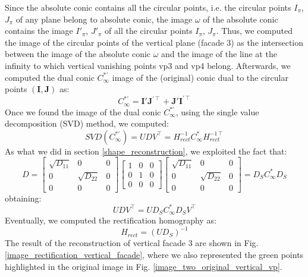 \documentclass[11pt, oneside]{article}
\begin{document}
Since the absolute conic contains all the circular points, i.e. the circular points $\textit{I}_\pi$, $\textit{J}_\pi$ of any plane belong to absolute conic, the image $\omega$ of the absolute conic contains the image $\textit{I}'_\pi$, $\textit{J}'_\pi$ of all the circular points $\textit{I}_\pi$, $\textit{J}_\pi$. Thus, we computed the image of the circular points of the vertical plane (facade 3) as the intersection between the image of the absolute conic $\omega$ and the image of the line at the infinity to which vertical vanishing points vp3 and vp4 belong. Afterwards, we computed the dual conic $C^{*'}_\infty$ image of the (original) conic dual to the circular points $(\textbf{I},\textbf{J})$ as:
\begin{equation}
	C^{*'}_\infty = \textbf{I}' \textbf{J}^{'\intercal} + \textbf{J}' \textbf{I}^{'\intercal}
\end{equation}
Once we found the image of the dual conic $C^{*'}_\infty$, using the single value decomposition (SVD) method, we computed:
\begin{equation}
	SVD(C^{*'}_\infty) = U D V^\intercal = H_{rect}^{-1} C^*_\infty H_{rect}^{-1\intercal}
\end{equation}
As what we did in section \ref{shape_reconstruction}, we exploited the fact that:
\begin{equation}
	D =
	\begin{bmatrix}
		\sqrt{D_{11}} & 0 & 0 \\ 0 & \sqrt{D_{22}} & 0 \\ 0 & 0 & 0
	\end{bmatrix}
	\begin{bmatrix}
		1 & 0 & 0 \\ 0 & 1 & 0 \\ 0 & 0 & 0
	\end{bmatrix}
	\begin{bmatrix}
		\sqrt{D_{11}} & 0 & 0 \\ 0 & \sqrt{D_{22}} & 0 \\ 0 & 0 & 0
	\end{bmatrix}
	= D_S C^*_\infty D_S
\end{equation}
obtaining:
\begin{equation}
	U D V^\intercal = U D_S C^*_\infty D_S V^\intercal
\end{equation}
Eventually, we computed the rectification homography as:
\begin{equation}
	H_{rect} = (U D_S)^{-1}
\end{equation}
The result of the reconstruction of vertical facade 3 are shown in Fig. \ref{image_rectification_vertical_facade}, where we also represented the green points highlighted in the original image in Fig. \ref{image_two_original_vertical_vp}.
\end{document}
